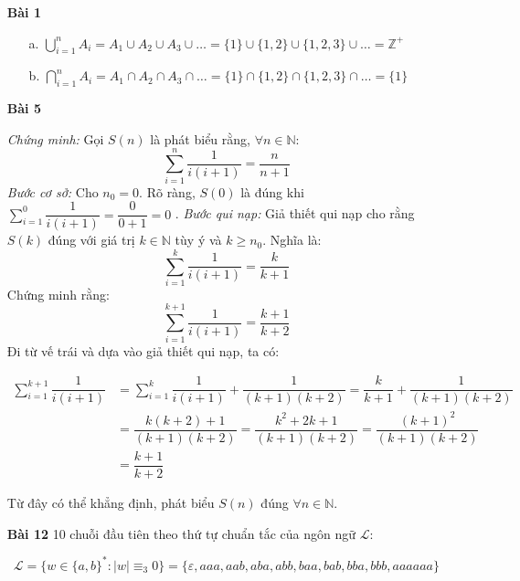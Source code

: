 \documentclass[12pt, a4paper]{article}
\begin{document}
	\begin{itemize}
		
		\item[ \textbf{Bài 1} ]
		
		\begin{itemize}
			
			\item[a.] $\bigcup_{i=1}^n A_i = A_1 \cup A_2 \cup A_3 \cup \ldots = \{1\} \cup \{1, 2\} \cup \{1, 2, 3\} \cup \ldots = \mathbb{Z}^+$	
			\item[b.] $\bigcap_{i=1}^n A_i = A_1 \cap A_2 \cap A_3 \cap \ldots = \{1\} \cap \{1, 2\} \cap \{1, 2, 3\} \cap \ldots = \{1\}$			
			
		\end{itemize}
		
		\item[ \textbf{Bài 5} ]
		
			\textit{Chứng minh:} Gọi $S(n)$ là phát biểu rằng, $\forall n \in \mathbb{N}$: \[\sum_{i=1}^n \dfrac{1}{i(i+1)} = \dfrac{n}{n+1}\]
			\textit{Bước cơ sở:} Cho $n_0=0$. Rõ ràng, $S(0)$ là đúng khi $\sum_{i=1}^0 \dfrac{1}{i(i+1)} = \dfrac{0}{0 + 1} = 0$ .
			\textit{Bước qui nạp:} Giả thiết qui nạp cho rằng $S(k)$ đúng với giá trị $k \in \mathbb{N}$ tùy ý và $k \geq n_0$. Nghĩa là: \[\sum_{i=1}^k \dfrac{1}{i(i+1)} = \dfrac{k}{k+1}\]
			Chứng minh rằng: \[\sum_{i=1}^{k+1} \dfrac{1}{i(i+1)} = \dfrac{k+1}{k+2}\]
			Đi từ vế trái và dựa vào giả thiết qui nạp, ta có: 
			
			\begin{equation*}
			\begin{split}
				\sum_{i=1}^{k+1} \dfrac{1}{i(i+1)} & = \sum_{i=1}^k \dfrac{1}{i(i+1)} + \dfrac{1}{(k+1)(k+2)} = \dfrac{k}{k+1} + \dfrac{1}{(k+1)(k+2)} \\ & = \dfrac{k(k+2) + 1}{(k+1)(k+2)} = \dfrac{k^2 + 2k + 1}{(k+1)(k+2)} = \dfrac{(k+1)^2}{(k+1)(k+2)} \\ & = \dfrac{k+1}{k+2}
			\end{split}	
			\end{equation*}
		
			Từ đây có thể khẳng định, phát biểu $S(n)$ đúng $\forall n \in \mathbb{N}$.
	
		\item[ \textbf{Bài 12} ] 10 chuỗi đầu tiên theo thứ tự chuẩn tắc của ngôn ngữ $\mathcal{L}$:
		
			\begin{equation*}
				\mathcal{L} = \{w \in \{a,b\}^* : |w| \equiv_{3} 0 \} = \{ \varepsilon, aaa, aab, aba, abb, baa, bab, bba, bbb, aaaaaa \}
			\end{equation*}
			

\end{itemize}
\end{document}
